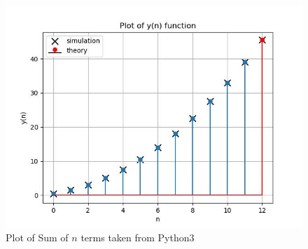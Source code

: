 \documentclass[journal,12pt,twocolumn]{IEEEtran}
\theoremstyle{remark}
\begin{document}
\begin{figure}[h]
\renewcommand\thefigure{1}
    \centering
    \includegraphics[width=1.0\columnwidth]{ncert-maths/10/5/3/18/figs/fig_1.jpg}
    \caption{Plot of Sum of $n$ terms taken from Python3}
    \label{fig_2}
\end{figure}
\end{document}
